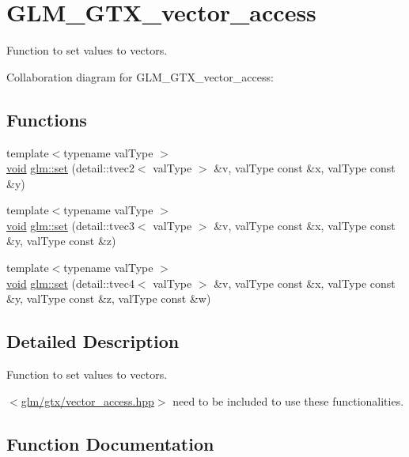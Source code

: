 \hypertarget{group__gtx__vector__access}{}\section{G\+L\+M\+\_\+\+G\+T\+X\+\_\+vector\+\_\+access}
\label{group__gtx__vector__access}


Function to set values to vectors.  


Collaboration diagram for G\+L\+M\+\_\+\+G\+T\+X\+\_\+vector\+\_\+access\+:
\subsection*{Functions}
\begin{DoxyCompactItemize}
\item 
{\footnotesize template$<$typename val\+Type $>$ }\\\hyperlink{_s_d_l__audio_8h_a52835ae37c4bb905b903cbaf5d04b05f}{void} \hyperlink{group__gtx__vector__access_ga9c62fba3500b14bef541683947df60b2}{glm\+::set} (detail\+::tvec2$<$ val\+Type $>$ \&v, val\+Type const \&x, val\+Type const \&y)
\item 
{\footnotesize template$<$typename val\+Type $>$ }\\\hyperlink{_s_d_l__audio_8h_a52835ae37c4bb905b903cbaf5d04b05f}{void} \hyperlink{group__gtx__vector__access_gad946e3cc3d91d7c2922bf266bb849a70}{glm\+::set} (detail\+::tvec3$<$ val\+Type $>$ \&v, val\+Type const \&x, val\+Type const \&y, val\+Type const \&z)
\item 
{\footnotesize template$<$typename val\+Type $>$ }\\\hyperlink{_s_d_l__audio_8h_a52835ae37c4bb905b903cbaf5d04b05f}{void} \hyperlink{group__gtx__vector__access_gad921fcd6b3e7e86d4da829492ca40f35}{glm\+::set} (detail\+::tvec4$<$ val\+Type $>$ \&v, val\+Type const \&x, val\+Type const \&y, val\+Type const \&z, val\+Type const \&w)
\end{DoxyCompactItemize}


\subsection{Detailed Description}
Function to set values to vectors. 

$<$\hyperlink{vector__access_8hpp}{glm/gtx/vector\+\_\+access.\+hpp}$>$ need to be included to use these functionalities. 

\subsection{Function Documentation}
\hypertarget{group__gtx__vector__access_ga9c62fba3500b14bef541683947df60b2}{}
